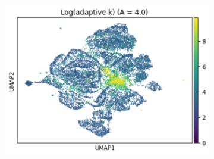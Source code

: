 \documentclass{article}
\begin{document}
\begin{figure}
\begin{subfigure}[t]{0.32\textwidth}
        \includegraphics[width=\linewidth]{figs/notMNIST/notMNIST_logadaK_Aeq4.png} %
    \end{subfigure}
    \hfill
    

\end{figure}
\end{document}
